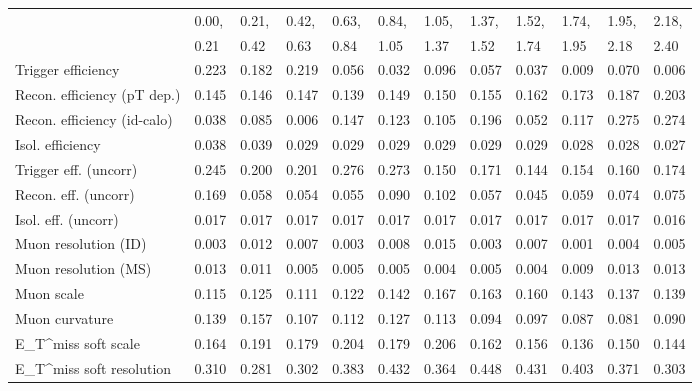 \begin{tabular}{l|p{0.6cm}p{0.6cm}p{0.6cm}p{0.6cm}p{0.6cm}p{0.6cm}p{0.6cm}p{0.6cm}p{0.6cm}p{0.6cm}p{0.6cm}}
\hline
   & 0.00, & 0.21, & 0.42, & 0.63, & 0.84, & 1.05, & 1.37, & 1.52, & 1.74, & 1.95, & 2.18,  \\ 
   & 0.21 & 0.42 & 0.63 & 0.84 & 1.05 & 1.37 & 1.52 & 1.74 & 1.95 & 2.18 & 2.40  \\ 
\hline
Trigger efficiency                       & 0.223 & 0.182 & 0.219 & 0.056 & 0.032 & 0.096 & 0.057 & 0.037 & 0.009 & 0.070 & 0.006 \\
Recon. efficiency (pT dep.)              & 0.145 & 0.146 & 0.147 & 0.139 & 0.149 & 0.150 & 0.155 & 0.162 & 0.173 & 0.187 & 0.203 \\
Recon. efficiency (id-calo)              & 0.038 & 0.085 & 0.006 & 0.147 & 0.123 & 0.105 & 0.196 & 0.052 & 0.117 & 0.275 & 0.274 \\
Isol. efficiency                         & 0.038 & 0.039 & 0.029 & 0.029 & 0.029 & 0.029 & 0.029 & 0.029 & 0.028 & 0.028 & 0.027 \\
Trigger eff. (uncorr)                    & 0.245 & 0.200 & 0.201 & 0.276 & 0.273 & 0.150 & 0.171 & 0.144 & 0.154 & 0.160 & 0.174 \\
Recon. eff. (uncorr)                     & 0.169 & 0.058 & 0.054 & 0.055 & 0.090 & 0.102 & 0.057 & 0.045 & 0.059 & 0.074 & 0.075 \\
Isol. eff. (uncorr)                      & 0.017 & 0.017 & 0.017 & 0.017 & 0.017 & 0.017 & 0.017 & 0.017 & 0.017 & 0.017 & 0.016 \\
Muon resolution (ID)                     & 0.003 & 0.012 & 0.007 & 0.003 & 0.008 & 0.015 & 0.003 & 0.007 & 0.001 & 0.004 & 0.005 \\
Muon resolution (MS)                     & 0.013 & 0.011 & 0.005 & 0.005 & 0.005 & 0.004 & 0.005 & 0.004 & 0.009 & 0.013 & 0.013 \\
Muon scale                               & 0.115 & 0.125 & 0.111 & 0.122 & 0.142 & 0.167 & 0.163 & 0.160 & 0.143 & 0.137 & 0.139 \\
Muon curvature                           & 0.139 & 0.157 & 0.107 & 0.112 & 0.127 & 0.113 & 0.094 & 0.097 & 0.087 & 0.081 & 0.090 \\
E_{T}^{miss} soft scale                  & 0.164 & 0.191 & 0.179 & 0.204 & 0.179 & 0.206 & 0.162 & 0.156 & 0.136 & 0.150 & 0.144 \\
E_{T}^{miss} soft resolution             & 0.310 & 0.281 & 0.302 & 0.383 & 0.432 & 0.364 & 0.448 & 0.431 & 0.403 & 0.371 & 0.303 \\

\end{tabular}
